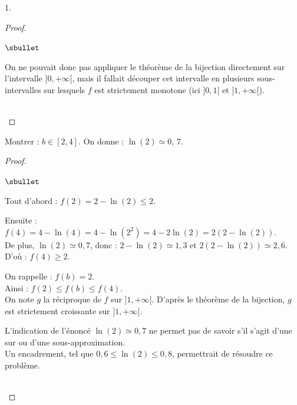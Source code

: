 \begin{noliste}{1.}
\begin{proof}
\begin{remark}
\begin{noliste}{$\sbullet$}
	\item On ne pouvait donc pas appliquer le théorème de la 
	bijection directement sur l'intervalle $]0,+\infty[$, mais il 
	fallait découper cet intervalle en plusieurs 
	sous-intervalles sur lesquels $f$ est strictement 
	monotone (ici $]0,1[$ et $]1,+\infty[$).
      \end{noliste}
    \end{remark}~\\[-1.4cm]
  \end{proof}

  
\item Montrer : $b \in [2,4]$. On donne : $\ln(2) \simeq 0, \, 7$.
  
  \begin{proof}~
    \begin{noliste}{$\sbullet$}
      \item Tout d'abord : $f(2) = 2-\ln(2) \leq 2$.
      \item Ensuite : $f(4) = 4-\ln(4) = 4 - \ln(2^2) = 4 -2\ln(2) =
      2(2-\ln(2))$.\\
      De plus, $\ln(2) \simeq 0,7$, donc : $2-\ln(2) \simeq 1,3$
      et $2(2-\ln(2)) \simeq 2,6$.\\
      D'où : $f(4) \geq 2$.
      
      \item On rappelle : $f(b)=2$.\\
      Ainsi : $f(2) \leq f(b) \leq f(4)$.\\
      On note $g$ la réciproque de $f$ sur $]1,+\infty[$. D'après le 
      théorème de la bijection, $g$ est strictement croissante sur 
      $]1,+\infty[$.
    \end{noliste}
    
    \begin{remark}
      L'indication de l'énoncé $\ln(2) \simeq 0,7$ ne permet pas de 
      savoir s'il s'agit d'une sur ou d'une sous-approximation.\\
      Un encadrement, tel que $0,6 \leq \ln(2) \leq 0,8$, 
      permettrait de résoudre ce problème.
    \end{remark}~\\[-1.4cm]
  \end{proof}
\end{noliste}


